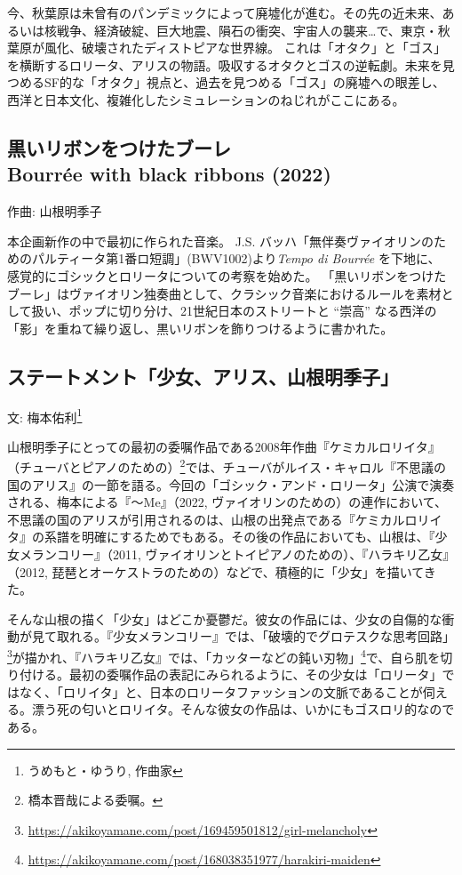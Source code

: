 \documentclass[a6paper, 9pt, openright, titlepage, twoside]{ltjsarticle}
\begin{document}
今、秋葉原は未曾有のパンデミックによって廃墟化が進む。その先の近未来、あるいは核戦争、経済破綻、巨大地震、隕石の衝突、宇宙人の襲来…で、東京・秋葉原が風化、破壊されたディストピアな世界線。 これは「オタク」と「ゴス」を横断するロリータ、アリスの物語。吸収するオタクとゴスの逆転劇。未来を見つめるSF的な「オタク」視点と、過去を見つめる「ゴス」の廃墟への眼差し、西洋と日本文化、複雑化したシミュレーションのねじれがここにある。


\subsection*{黒いリボンをつけたブーレ \\
Bourrée with black ribbons (2022) }\label{bouree}
{\small 作曲: 山根明季子}

本企画新作の中で最初に作られた音楽。 J.S. バッハ「無伴奏ヴァイオリンのためのパルティータ第1番ロ短調」(BWV1002)より{\itshape Tempo di Bourrée} を下地に、 感覚的にゴシックとロリータについての考察を始めた。 「黒いリボンをつけたブーレ」はヴァイオリン独奏曲として、クラシック音楽におけるルールを素材として扱い、ポップに切り分け、21世紀日本のストリートと ``崇高'' なる西洋の「影」を重ねて繰り返し、黒いリボンを飾りつけるように書かれた。


\newpage


\subsection*{ステートメント「少女、アリス、山根明季子」}\label{statement}
{\small 文: 梅本佑利}\footnote{うめもと・ゆうり, 作曲家}  

山根明季子にとっての最初の委嘱作品である2008年作曲『ケミカルロリイタ』（チューバとピアノのための）\footnote{ 橋本晋哉による委嘱。}では、チューバがルイス・キャロル『不思議の国のアリス』の一節を語る。今回の「ゴシック・アンド・ロリータ」公演で演奏される、梅本による『～Me』（2022, ヴァイオリンのための）の連作において、不思議の国のアリスが引用されるのは、山根の出発点である『ケミカルロリイタ』の系譜を明確にするためでもある。その後の作品においても、山根は、『少女メランコリー』（2011, ヴァイオリンとトイピアノのための）、『ハラキリ乙女』（2012, 琵琶とオーケストラのための）などで、積極的に「少女」を描いてきた。

そんな山根の描く「少女」はどこか憂鬱だ。彼女の作品には、少女の自傷的な衝動が見て取れる。『少女メランコリー』では、「破壊的でグロテスクな思考回路」\footnote{\url{ https://akikoyamane.com/post/169459501812/girl-melancholy}}が描かれ、『ハラキリ乙女』では、「カッターなどの鈍い刃物」\footnote{\url{https://akikoyamane.com/post/168038351977/harakiri-maiden}}で、自ら肌を切り付ける。最初の委嘱作品の表記にみられるように、その少女は「ロリータ」ではなく、「ロリイタ」と、日本のロリータファッションの文脈であることが伺える。漂う死の匂いとロリイタ。そんな彼女の作品は、いかにもゴスロリ的なのである。
\end{document}
